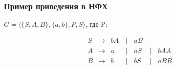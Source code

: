 \documentclass{beamer}
\begin{document}
\begin{frame}[fragile]
  \transwipe[direction=90]
  \frametitle{Пример приведения в НФХ}    
  $G = \langle \{S, A, B\}, \{a, b\}, P, S\rangle$, где P:
  
  $$
  \begin{array}{crclllll}
   & S & \rightarrow & bA &\, | \, & aB \\
   & A & \rightarrow & a &\, | \, & aS &\, | \,&  bAA  \\
   & B & \rightarrow &  b & \, | \, &  bS & \, | \, & a BB 
  \end{array}
  $$
\end{frame}



 
\end{document}
